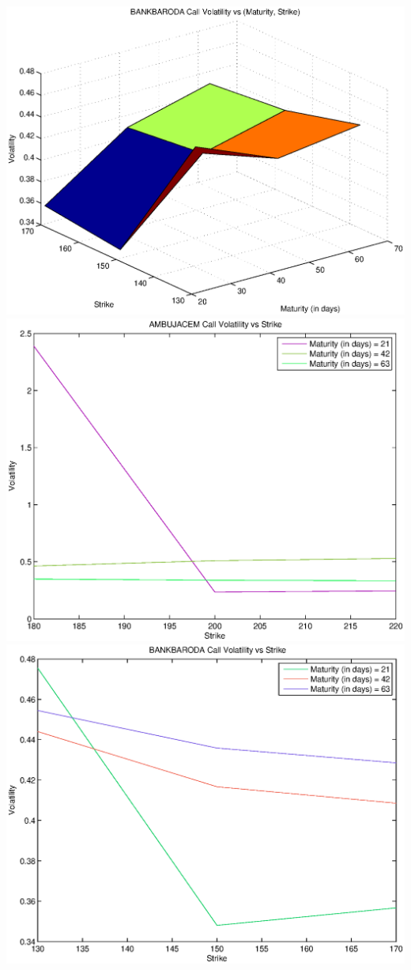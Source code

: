 \documentclass{article}
\begin{document}
\includegraphics[width=\textwidth]{BANKBARODA_Call_Volatility_vs_(Maturity,_Strike)} \\
\includegraphics[width=\textwidth]{AMBUJACEM_Call_Volatility_vs_Strike} \\                 
\includegraphics[width=\textwidth]{BANKBARODA_Call_Volatility_vs_Strike} \\
\end{document}
